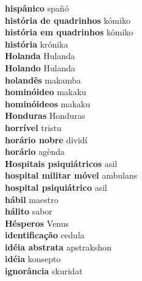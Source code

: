 \textbf{ hispânico  } spañó \\
\textbf{ história de quadrinhos  } kómiko \\
\textbf{ história em quadrinhos  } kómiko \\
\textbf{ história  } krónika \\
\textbf{ Holanda  } Hulanda \\
\textbf{ Holando  } Hulanda \\
\textbf{ holandês  } makamba \\
\textbf{ hominóideo  } makaku \\
\textbf{ hominóideos  } makaku \\
\textbf{ Honduras  } Honduras \\
\textbf{ horrível  } tristu \\
\textbf{ horário nobre  } dividí \\
\textbf{ horário  } agènda \\
\textbf{ Hospitais psiquiátricos  } asil \\
\textbf{ hospital militar móvel  } ambulans \\
\textbf{ hospital psiquiátrico  } asil \\
\textbf{ hábil  } maestro \\
\textbf{ hálito  } sabor \\
\textbf{ Hésperos  } Venus \\
\textbf{ identificação  } cedula \\
\textbf{ idéia abstrata  } apstrakshon \\
\textbf{ idéia  } konsepto \\
\textbf{ ignorância  } skuridat \\
